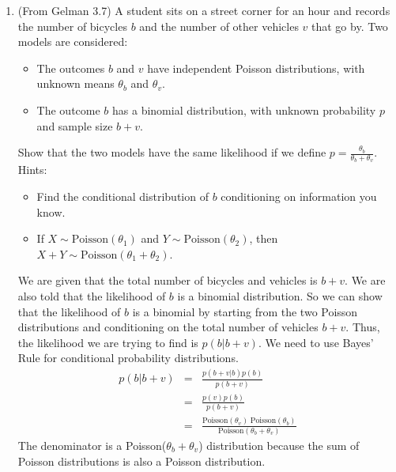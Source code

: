 \documentclass[10pt,a4paper]{article}
\newcommand{\red}{\color{red}}
\begin{document}
\begin{enumerate}
\begin{enumerate}
\end{enumerate}

\bigskip

\item (From Gelman 3.7) A student sits on a street corner for an hour and records the number of bicycles $b$ and the number of other vehicles $v$ that go by.  Two models are considered:
\begin{itemize}
\item The outcomes $b$ and $v$ have independent Poisson distributions, with unknown means $\theta_b$ and $\theta_v$.
\item The outcome $b$ has a binomial distribution, with unknown probability $p$ and sample size $b + v$.
\end{itemize}
Show that the two models have the same likelihood if we define $p = \frac{\theta_b}{\theta_b + \theta_v}$. \\

Hints:
\begin{itemize}
\item Find the conditional distribution of $b$ conditioning on information you know.
\item If $X \sim \mathrm{Poisson}(\theta_1)$ and $Y \sim \mathrm{Poisson}(\theta_2)$, then $X+Y \sim \mathrm{Poisson}(\theta_1 + \theta_2)$.
\end{itemize}

\medskip \red
We are given that the total number of bicycles and vehicles is $b+v$.
We are also told that the likelihood of $b$ is a binomial
distribution.  So we can show that the likelihood of $b$ is a binomial
by starting from the two Poisson distributions and conditioning on the
total number of vehicles $b+v$. Thus, the likelihood we are trying to
find is $p(b | b+v)$.  We need to use Bayes' Rule for conditional
probability distributions.
\begin{eqnarray*}
p(b | b + v) &=& \frac{p(b + v | b) p(b)}{p(b+v)}\\
&=& \frac{p(v) p(b)}{p(b+v)} \\
&=& \frac{\mathrm{Poisson}(\theta_v) \;
\mathrm{Poisson}(\theta_b)}{\mathrm{Poisson}(\theta_b + \theta_v)}
\end{eqnarray*}
The denominator is a Poisson($\theta_b + \theta_v$) distribution
because the sum of Poisson distributions is also a Poisson distribution.\\


\end{enumerate}
\end{document}
